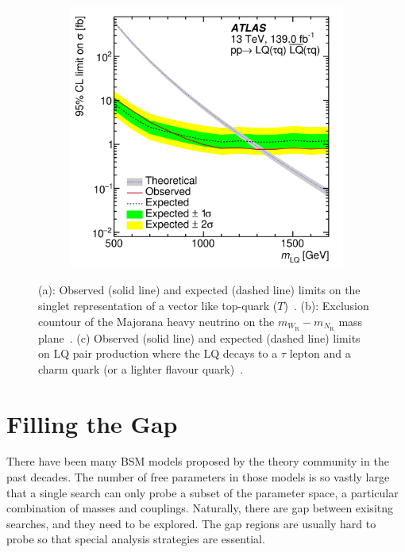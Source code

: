 \documentclass{moriond}
\begin{document}
\begin{figure}[htp]
\begin{subfigure}[b]{0.25\textwidth}
         \centering
         \includegraphics[width=\textwidth]{excited}
         \label{fig:excited}
     \end{subfigure}
        \caption{(a): Observed (solid line) and expected (dashed line) limits on the singlet representation of a vector like top-quark ($T$)~\cite{vlq}. (b): Exclusion countour of the Majorana heavy neutrino on the $m_{W_{\mathrm{R}}}-m_{N_{\mathrm{R}}}$ mass plane~\cite{rhn}. (c) Observed (solid line) and expected (dashed line) limits on LQ pair production where the LQ decays to a $\tau$ lepton and a charm quark (or a lighter flavour quark)~\cite{tau}.}
        \label{fig:limits1}
\end{figure}

\section{Filling the Gap}

There have been many BSM models proposed by the theory community in the past
decades. The number of free parameters in those models is so vastly large that
a single search can only probe a subset of the parameter space, a particular
combination of masses and couplings. Naturally, there are gap between exisitng
searches, and they need to be explored. The gap regions are usually hard to
probe so that special analysis strategies are essential.\\
\end{document}
